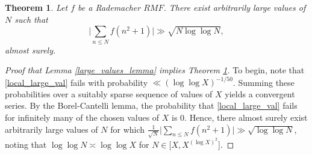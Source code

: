 \documentclass[10pt,a4paper]{amsart}
\newtheorem{thm}{Theorem}
\begin{document}
\begin{thm}
    \label{large_values_theorem} Let $f$ be a Rademacher $RMF$. There exist arbitrarily large values of $N$ such that
    \begin{equation}
        \Big|\sum_{n\leq N} f(n^2 + 1)\Big| \gg \sqrt{N\log\log N},
    \end{equation}
    almost surely.
\end{thm}

\begin{proof} [Proof that Lemma \ref{large_values_lemma} implies Theorem \ref{large_values_theorem}]
    To begin, note that \eqref{local_large_val} fails with probability $\ll (\log\log X)^{-1/50}$. Summing these probabilities over a suitably sparse sequence of values of $X$ yields a convergent series. By the Borel-Cantelli lemma, the probability that \eqref{local_large_val} fails for infinitely many of the chosen values of $X$ is $0$. Hence, there almost surely exist arbitrarily large values of $N$ for which $\frac{1}{\sqrt{N}}\Big|\sum_{n\leq N} f(n^2 + 1)\Big|\gg \sqrt{\log\log N}$, noting that $\log\log N\asymp \log \log X$ for $N\in[X, X^{(\log X)^2}$]. 
\end{proof}
\end{document}
